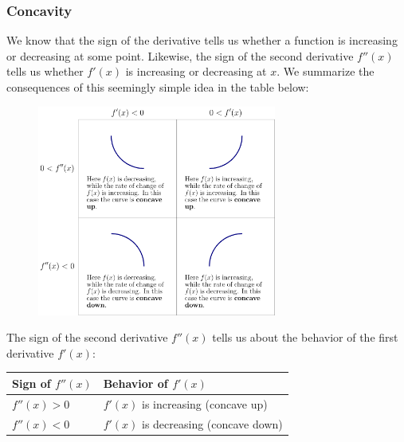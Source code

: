 \documentclass{article}
\begin{document}
\subsubsection*{Concavity}

We know that the sign of the derivative tells us whether a function is increasing or decreasing at some point. Likewise, the sign of the second derivative $f''(x)$ tells us whether $f'(x)$ is increasing or decreasing at $x$. We summarize the consequences of this seemingly simple idea in the table below:


\begin{figure}[ht]
    \centering
    \includegraphics[width=0.7\textwidth]{imgs/digInConcavityAnd2ndDerivTest-figure0.png}
\end{figure}

The sign of the second derivative $f''(x)$ tells us about the behavior of the first derivative $f'(x)$:

\begin{center}
\begin{tabular}{@{}ll@{}}
\toprule
Sign of $f''(x)$ & Behavior of $f'(x)$ \\
\midrule
$f''(x) > 0$ & $f'(x)$ is increasing (concave up) \\
$f''(x) < 0$ & $f'(x)$ is decreasing (concave down) \\
\bottomrule
\end{tabular}
\end{center}



\newpage 
\end{document}
